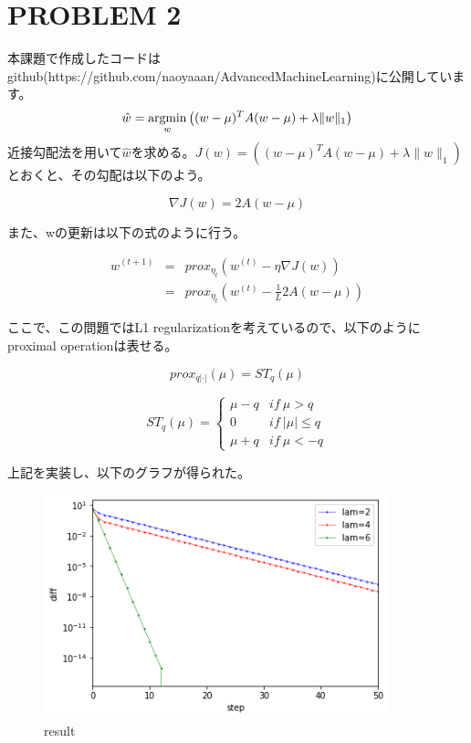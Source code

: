 \documentclass[a4j,11pt]{jarticle}
\newcommand{\argmin}{\mathop{\rm argmin}\limits}
\begin{document}
\newpage
\section{PROBLEM 2}
本課題で作成したコードはgithub(https://github.com/naoyaaan/AdvancedMachineLearning)に公開しています。
\begin{equation}
    \hat{w} = \argmin_{w} \left((w-\mu)^{T}A(w-\mu)+\lambda \|w\|_1\right)
\end{equation}
近接勾配法を用いて$\hat{w}$を求める。$J(w) = \left((w-\mu)^{T}A(w-\mu)+\lambda \|w\|_1\right)$とおくと、その勾配は以下のよう。

\begin{equation}
    \nabla J(w) = 2A(w-\mu)
\end{equation}

また、wの更新は以下の式のように行う。

\begin{eqnarray}
    w^{(t+1)} &=& prox_{\eta_t} \left(w^{(t)} - \eta\nabla J(w)\right)\\
    &=& prox_{\eta_t} \left(w^{(t)} - \frac{1}{L}2A(w-\mu)\right)
\end{eqnarray}

ここで、この問題ではL1 regularizationを考えているので、以下のようにproximal operationは表せる。

\begin{equation}
    prox_{q|\cdot|}(\mu) = ST_q(\mu)
\end{equation}

\begin{equation}
    ST_q(\mu) = \begin{cases}
        \mu-q & if~\mu > q \\
        0 & if~|\mu| \leq q \\
        \mu+q & if~\mu < -q
    \end{cases}
\end{equation}

上記を実装し、以下のグラフが得られた。
\begin{figure}[htbp]
    \centering
    \includegraphics[width=100mm]{p2-4.png}
    \caption{result}
\end{figure}
\end{document}
